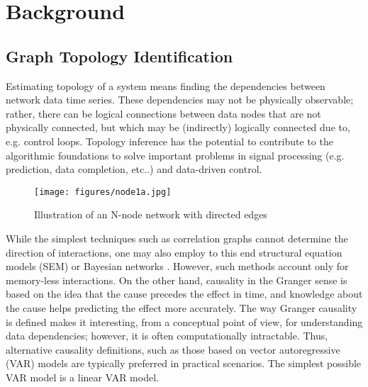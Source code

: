 \section{Background}
 \subsection{Graph Topology Identification}
 
Estimating topology of a system means finding the dependencies between network data time series. These dependencies may not be physically observable; rather, there can be logical connections between data nodes that are not physically connected, but which may be (indirectly) logically connected due to, e.g. control loops. %
Topology inference has the potential to contribute to the algorithmic foundations to solve important problems in signal processing (e.g. prediction, data completion, etc..) and data-driven control.

\begin{figure}[h]
\centering
\texttt{[image: figures/node1a.jpg]}
\caption{{Illustration of an N-node network with directed edges%
}} 
\label{fig:node_edges}
\end{figure}

While the simplest techniques such as correlation graphs \cite{jin2020correlated} cannot determine the direction of interactions, one may also employ to this end structural equation models (SEM) or Bayesian networks \cite{yanuar2014estimation}. However, such methods account only for memory-less interactions. On the other hand, causality in the Granger \cite{granger1988concept} sense is based on the idea that the cause precedes the effect in time, and knowledge about the cause helps predicting the effect more accurately. The way Granger causality is defined makes it interesting, from a conceptual point of view, for understanding data dependencies; however, it is often computationally intractable. Thus, alternative causality definitions, such as those based on vector autoregressive (VAR) models \cite{granger1988concept,zaman2020online} are typically preferred in practical scenarios. The simplest possible VAR model is a linear VAR model. 

